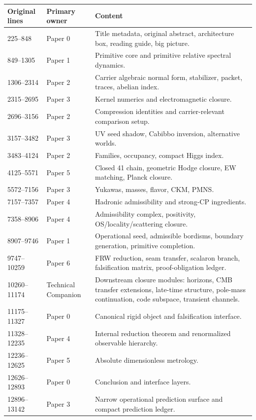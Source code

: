 \documentclass[11pt,a4paper]{article}
\begin{document}
\begin{longtable}{@{}p{}p{}p{}@{}}
\toprule
\textbf{Original lines} & \textbf{Primary owner} & \textbf{Content}\\
\midrule
225--848 & Paper 0 & Title metadata, original abstract, architecture box, reading guide, big picture.\\
849--1305 & Paper 1 & Primitive core and primitive relative spectral dynamics.\\
1306--2314 & Paper 2 & Carrier algebraic normal form, stabilizer, packet, traces, abelian index.\\
2315--2695 & Paper 3 & Kernel numerics and electromagnetic closure.\\
2696--3156 & Paper 2 & Compression identities and carrier-relevant comparison setup.\\
3157--3482 & Paper 3 & UV seed shadow, Cabibbo inversion, alternative worlds.\\
3483--4124 & Paper 2 & Families, occupancy, compact Higgs index.\\
4125--5571 & Paper 5 & Closed 41 chain, geometric Hodge closure, EW matching, Planck closure.\\
5572--7156 & Paper 3 & Yukawas, masses, flavor, CKM, PMNS.\\
7157--7357 & Paper 4 & Hadronic admissibility and strong-CP ingredients.\\
7358--8906 & Paper 4 & Admissibility complex, positivity, OS/locality/scattering closure.\\
8907--9746 & Paper 1 & Operational seed, admissible bordisms, boundary generation, primitive completion.\\
9747--10259 & Paper 6 & FRW reduction, seam transfer, scalaron branch, falsification matrix, proof-obligation ledger.\\
10260--11174 & Technical Companion & Downstream closure modules: horizons, CMB transfer extensions, late-time structure, pole-mass continuation, code subspace, transient channels.\\
11175--11327 & Paper 0 & Canonical rigid object and falsification interface.\\
11328--12235 & Paper 4 & Internal reduction theorem and renormalized observable hierarchy.\\
12236--12625 & Paper 5 & Absolute dimensionless metrology.\\
12626--12893 & Paper 0 & Conclusion and interface layers.\\
12896--13142 & Paper 3 & Narrow operational prediction surface and compact prediction ledger.\\

\end{longtable}
\end{document}
